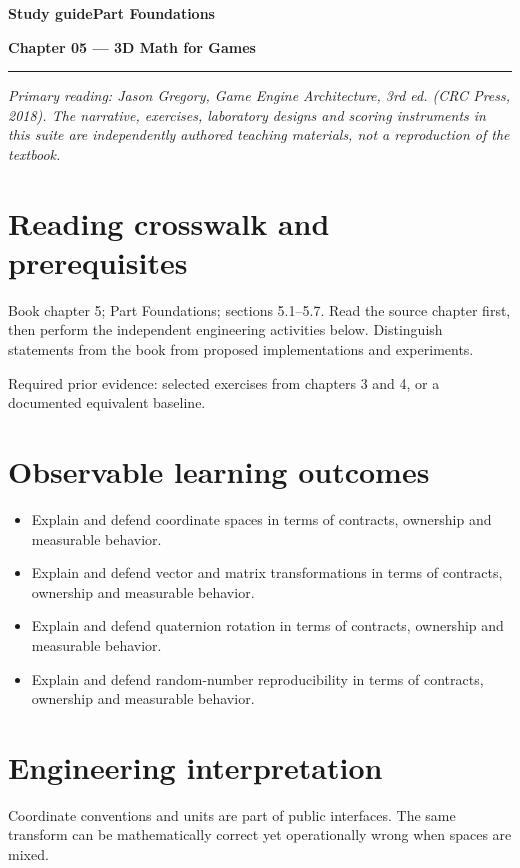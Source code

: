 \documentclass[11pt,letterpaper]{article}
\newcommand{\DocType}{Reference}
\newcommand{\SuiteHeading}[3]{%
\renewcommand{\DocType}{#2}%
{\small\bfseries\sffamily\color{EngineTeal}#2\hfill #3}\par\vspace{6pt}
{\LARGE\bfseries\color{EngineBlue}#1}\par\vspace{4pt}
{\color{EngineTeal}\rule{\linewidth}{1pt}}\par\vspace{7pt}}
\newcommand{\SourceNote}{\footnotesize\textit{Primary reading: Jason Gregory, \emph{Game Engine Architecture}, 3rd ed. (CRC Press, 2018). The narrative, exercises, laboratory designs and scoring instruments in this suite are independently authored teaching materials, not a reproduction of the textbook.}\normalsize\par}
\begin{document}
\SuiteHeading{Chapter 05 — 3D Math for Games}{Study guide}{Part Foundations}
\SourceNote
\section{Reading crosswalk and prerequisites}
Book chapter 5; Part Foundations; sections 5.1--5.7. Read the source chapter first, then perform the independent engineering activities below. Distinguish statements from the book from proposed implementations and experiments.

Required prior evidence: selected exercises from chapters 3 and 4, or a documented equivalent baseline.

\section{Observable learning outcomes}
\begin{itemize}
\item Explain and defend coordinate spaces in terms of contracts, ownership and measurable behavior.
\item Explain and defend vector and matrix transformations in terms of contracts, ownership and measurable behavior.
\item Explain and defend quaternion rotation in terms of contracts, ownership and measurable behavior.
\item Explain and defend random-number reproducibility in terms of contracts, ownership and measurable behavior.
\end{itemize}
\section{Engineering interpretation}
Coordinate conventions and units are part of public interfaces. The same transform can be mathematically correct yet operationally wrong when spaces are mixed.
\end{document}
